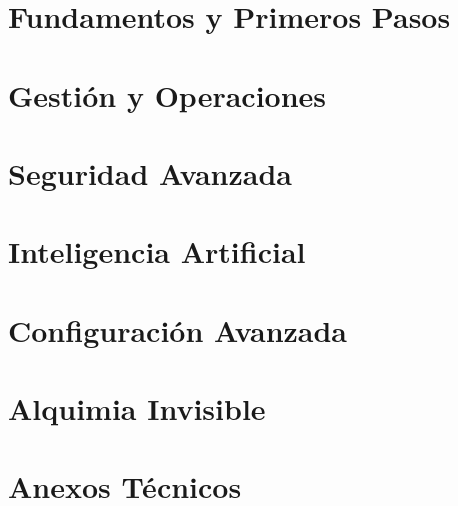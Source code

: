 \documentclass[
    11pt,
    oneside,
    openright,
    spanish,
    a4paper
]{book}
\begin{document}


\frontmatter
{}





\tableofcontents
\listoffigures
\listoftables

\mainmatter
{}

\part{Fundamentos y Primeros Pasos}



\part{Gestión y Operaciones}
\clearpage

\clearpage


\part{Seguridad Avanzada}
\clearpage


\part{Inteligencia Artificial}
\clearpage


\part{Configuración Avanzada}
\clearpage


\part{Alquimia Invisible}
\clearpage


\appendix
\part{Anexos Técnicos}


\backmatter
\printindex
\end{document}
